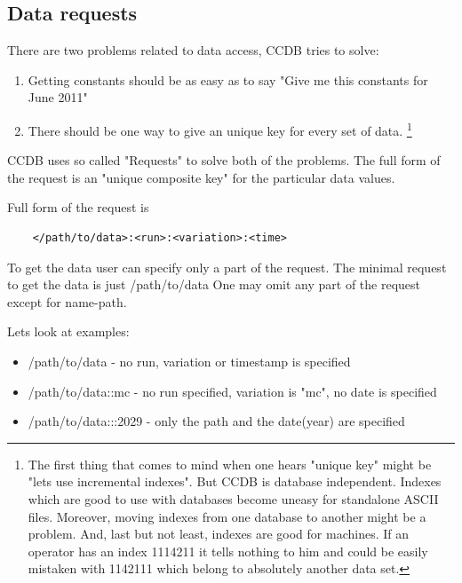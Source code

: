 \documentclass{article}
\begin{document}
\subsection{Data requests}

There are two problems related to data access, CCDB tries to solve:
\begin{enumerate}
  \item Getting constants should be as easy as to say
        "Give me this constants for June 2011"

  \item There should be one way to give an unique key for every set of data.
  \footnote{
    The first thing that comes to mind when one hears "unique key" might be
    "lets use incremental indexes". But CCDB is database independent. Indexes
    which are good to use with databases become uneasy for standalone ASCII
    files. Moreover, moving indexes from one database to another might be a
    problem. And, last but not least, indexes are good for machines. If an
    operator has an index 1114211 it tells nothing to him and could be easily
    mistaken with 1142111 which belong to absolutely another data set.
  }
\end{enumerate}
\vspace{1 em}

CCDB uses so called "Requests" to solve both of the problems.
The full form of  the request is an "unique composite key" for
the particular data values.

Full form of the request is
\begin{verbatim}
    </path/to/data>:<run>:<variation>:<time>
\end{verbatim}
\vspace{1 em}

To get the data user can specify only a part of the request.
The minimal request to get the data is just /path/to/data
One may omit any part of the request except for name-path.

Lets look at examples:
\begin{itemize}
\item /path/to/data - no run, variation or timestamp is specified
\item /path/to/data::mc - no run specified, variation is "mc", no date is specified
\item /path/to/data:::2029 - only the path and the date(year) are specified
\end{itemize}
\end{document}

